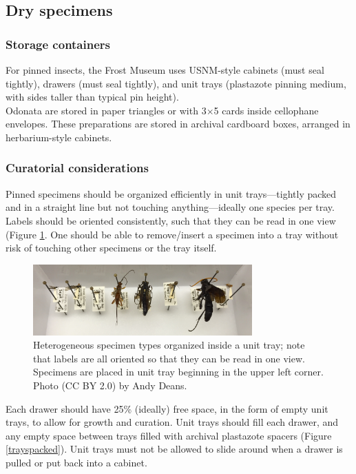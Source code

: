 \documentclass[letterpaper, 11pt]{article}
\begin{document}
\subsection{Dry specimens}
\subsubsection{Storage containers}
For pinned insects, the Frost Museum uses USNM-style cabinets (must seal tightly), drawers (must seal tightly), and unit trays (plastazote pinning medium, with sides taller than typical pin height). \\

\noindent{}Odonata are stored in paper triangles or with 3$\times$5 cards inside cellophane envelopes. These preparations are stored in archival cardboard boxes, arranged in herbarium-style cabinets.

\subsubsection{Curatorial considerations}
Pinned specimens should be organized efficiently in unit trays---tightly packed and in a straight line but not touching anything---ideally one species per tray. Labels should be oriented consistently, such that they can be read in one view (Figure \ref{labelorient}. One should be able to remove/insert a specimen into a tray without risk of touching other specimens or the tray itself.\\

\begin{figure}[ht!]
	\centering
  \includegraphics[width=0.75\textwidth]{labelOrientation}
  \caption{Heterogeneous specimen types organized inside a unit tray; note that labels are all oriented so that they can be read in one view. Specimens are placed in unit tray beginning in the upper left corner. Photo (CC BY 2.0) by Andy Deans.}
  \label{labelorient}
\end{figure}

\noindent{}Each drawer should have 25\% (ideally) free space, in the form of empty unit trays, to allow for growth and curation. Unit trays should fill each drawer, and any empty space between trays filled with archival plastazote spacers (Figure \ref{trayspacked}). Unit trays must not be allowed to slide around when a drawer is pulled or put back into a cabinet.\\
\end{document}
